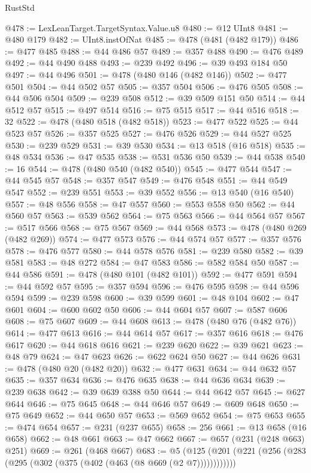 \begin{lexlean}{RustStd}
\begin{coremodule}
{\begin{coremodule}
{{{{{{{{{{{{{{{@478 := LexLeanTarget.TargetSyntax.Value.u8
@480 := @12 UInt8
@481 := @480 @179
@482 := UInt8.instOfNat
@485 := @478 (@481 (@482 @179))
@486 := @477 @485
@488 := @44 @486 @57
@489 := @357 @488
@490 := @476 @489
@492 := @44 @490 @488
@493 := @239 @492
@496 := @39 @493 @184 @50
@497 := @44 @496
@501 := @478 (@480 @146 (@482 @146))
@502 := @477 @501
@504 := @44 @502 @57
@505 := @357 @504
@506 := @476 @505
@508 := @44 @506 @504
@509 := @239 @508
@512 := @39 @509 @151 @50
@514 := @44 @512 @57
@515 := @497 @514
@516 := @75 @515
@517 := @44 @516
@518 := 32
@522 := @478 (@480 @518 (@482 @518))
@523 := @477 @522
@525 := @44 @523 @57
@526 := @357 @525
@527 := @476 @526
@529 := @44 @527 @525
@530 := @239 @529
@531 := @39 @530
@534 := @13 @518 (@16 @518)
@535 := @48 @534
@536 := @47 @535
@538 := @531 @536 @50
@539 := @44 @538
@540 := 16
@544 := @478 (@480 @540 (@482 @540))
@545 := @477 @544
@547 := @44 @545 @57
@548 := @357 @547
@549 := @476 @548
@551 := @44 @549 @547
@552 := @239 @551
@553 := @39 @552
@556 := @13 @540 (@16 @540)
@557 := @48 @556
@558 := @47 @557
@560 := @553 @558 @50
@562 := @44 @560 @57
@563 := @539 @562
@564 := @75 @563
@566 := @44 @564 @57
@567 := @517 @566
@568 := @75 @567
@569 := @44 @568
@573 := @478 (@480 @269 (@482 @269))
@574 := @477 @573
@576 := @44 @574 @57
@577 := @357 @576
@578 := @476 @577
@580 := @44 @578 @576
@581 := @239 @580
@582 := @39 @581
@583 := @48 @272
@584 := @47 @583
@586 := @582 @584 @50
@587 := @44 @586
@591 := @478 (@480 @101 (@482 @101))
@592 := @477 @591
@594 := @44 @592 @57
@595 := @357 @594
@596 := @476 @595
@598 := @44 @596 @594
@599 := @239 @598
@600 := @39 @599
@601 := @48 @104
@602 := @47 @601
@604 := @600 @602 @50
@606 := @44 @604 @57
@607 := @587 @606
@608 := @75 @607
@609 := @44 @608
@613 := @478 (@480 @76 (@482 @76))
@614 := @477 @613
@616 := @44 @614 @57
@617 := @357 @616
@618 := @476 @617
@620 := @44 @618 @616
@621 := @239 @620
@622 := @39 @621
@623 := @48 @79
@624 := @47 @623
@626 := @622 @624 @50
@627 := @44 @626
@631 := @478 (@480 @20 (@482 @20))
@632 := @477 @631
@634 := @44 @632 @57
@635 := @357 @634
@636 := @476 @635
@638 := @44 @636 @634
@639 := @239 @638
@642 := @39 @639 @388 @50
@644 := @44 @642 @57
@645 := @627 @644
@646 := @75 @645
@648 := @44 @646 @57
@649 := @609 @648
@650 := @75 @649
@652 := @44 @650 @57
@653 := @569 @652
@654 := @75 @653
@655 := @474 @654
@657 := @231 (@237 @655)
@658 := 256
@661 := @13 @658 (@16 @658)
@662 := @48 @661
@663 := @47 @662
@667 := @657 (@231 (@248 @663) @251)
@669 := @261 (@468 @667)
@683 := @5 (@125 (@201 (@221 (@256 (@283 (@295 (@302 (@375 (@402 (@463 (@8 @669 (@2 @7))))))))))))
}}}}}}}}}}}}}}}
\end{coremodule}}
\end{coremodule}
\end{lexlean}

